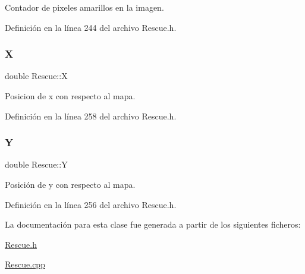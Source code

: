 Contador de pixeles amarillos en la imagen. 



Definición en la línea 244 del archivo Rescue.\+h.

\mbox{\label{classRescue_ab2a4cd163b6619df49346383bb08d365_ab2a4cd163b6619df49346383bb08d365}} 
\subsubsection{\texorpdfstring{X}{X}}
{\footnotesize\ttfamily double Rescue\+::X\hspace{0.3cm}{\ttfamily [private]}}



Posicion de x con respecto al mapa. 



Definición en la línea 258 del archivo Rescue.\+h.

\mbox{\label{classRescue_aefe62362f68d14dc3f9234791de23882_aefe62362f68d14dc3f9234791de23882}} 
\subsubsection{\texorpdfstring{Y}{Y}}
{\footnotesize\ttfamily double Rescue\+::Y\hspace{0.3cm}{\ttfamily [private]}}



Posición de y con respecto al mapa. 



Definición en la línea 256 del archivo Rescue.\+h.



La documentación para esta clase fue generada a partir de los siguientes ficheros\+:\begin{DoxyCompactItemize}
\item 
\hyperlink{Rescue_8h}{Rescue.\+h}\item 
\hyperlink{Rescue_8cpp}{Rescue.\+cpp}\end{DoxyCompactItemize}
